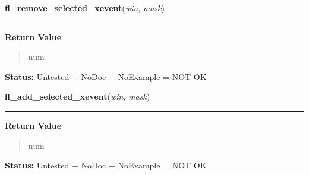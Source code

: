     \vspace{0.5ex}

\hspace{.8\funcindent}\begin{boxedminipage}{\funcwidth}

    \raggedright \textbf{fl\_remove\_selected\_xevent}(\textit{win}, \textit{mask})

    \vspace{-1.5ex}

    \rule{\textwidth}{0.5\fboxrule}
\setlength{\parskip}{2ex}
\setlength{\parskip}{1ex}
      \textbf{Return Value}
    \vspace{-1ex}

      \begin{quote}
      num

      \end{quote}

\textbf{Status:} Untested + NoDoc + NoExample = NOT OK



    \end{boxedminipage}

    \label{xformslib:library:fl_addto_selected_xevent}

    \vspace{0.5ex}

\hspace{.8\funcindent}\begin{boxedminipage}{\funcwidth}

    \raggedright \textbf{fl\_add\_selected\_xevent}(\textit{win}, \textit{mask})

    \vspace{-1.5ex}

    \rule{\textwidth}{0.5\fboxrule}
\setlength{\parskip}{2ex}
\setlength{\parskip}{1ex}
      \textbf{Return Value}
    \vspace{-1ex}

      \begin{quote}
      num

      \end{quote}

\textbf{Status:} Untested + NoDoc + NoExample = NOT OK



    \end{boxedminipage}

    \label{xformslib:library:fl_set_idle_delta}


